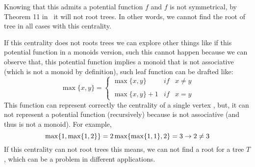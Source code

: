 Knowing that this admits a potential function $f$ and $f$ is not symmetrical, by Theorem 11 in~\cite{RiverosSS23} it will not root trees. In other words, we cannot find the root of tree in all cases with this centrality. 

If this centrality does not roots trees we can explore other things like if this potential function in a monoids version, such this cannot happen because we can observe that, this potential function implies a monoid that is not associative (which is not a monoid by definition), such leaf function can be drafted like:
\begin{equation}
    \max\{ x,y \}= \left\{ \begin{array}{lcc}
              \max\{x,y \} &   if  & x \neq y \\
             \\ \max\{ x,y \} + 1 & if  & x = y 
             \end{array}
   \right.
\end{equation}
This function can represent correctly the centrality of a single vertex , but, it can not represent a potential function (recursively) because is not associative (and thus is not a monoid). For example,
\begin{equation}
    \max\{ 1,\max\{ 1,2 \} \} = 2 \\
    \vspace{0.5cm}
    \max\{ \max\{ 1,1 \},2 \}  = 3 \\
    \vspace{0.5cm}
    \rightarrow 2 \neq 3
\end{equation}
If this centrality can not root trees this means, we can not find a root for a tree $T$, which can be a problem in different applications.


